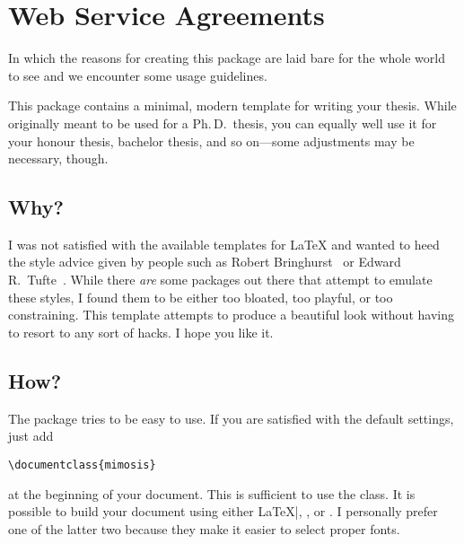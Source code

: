 \chapter{Web Service Agreements}

\begin{center}
  \begin{minipage}{0.5\textwidth}
    \begin{small}
      In which the reasons for creating this package are laid bare for the
      whole world to see and we encounter some usage guidelines.
    \end{small}
  \end{minipage}
  \vspace{0.5cm}
\end{center}

\noindent This package contains a minimal, modern template for writing your
thesis. While originally meant to be used for a Ph.\,D.\ thesis, you can
equally well use it for your honour thesis, bachelor thesis, and so
on---some adjustments may be necessary, though.

\section{Why?}

I was not satisfied with the available templates for \LaTeX{} and wanted
to heed the style advice given by people such as Robert
Bringhurst~\cite{Bringhurst12} or Edward R.\
Tufte~\cite{Tufte90,Tufte01}. While there \emph{are} some packages out
there that attempt to emulate these styles, I found them to be either
too bloated, too playful, or too constraining. This template attempts to
produce a beautiful look without having to resort to any sort of hacks.
I hope you like it.

\section{How?}

The package tries to be easy to use. If you are satisfied with the
default settings, just add
%
\begin{verbatim}
\documentclass{mimosis}
\end{verbatim}
%
at the beginning of your document. This is sufficient to use the class.
It is possible to build your document using either \LaTeX|, \XeLaTeX, or
\LuaLaTeX. I personally prefer one of the latter two because they make
it easier to select proper fonts.


